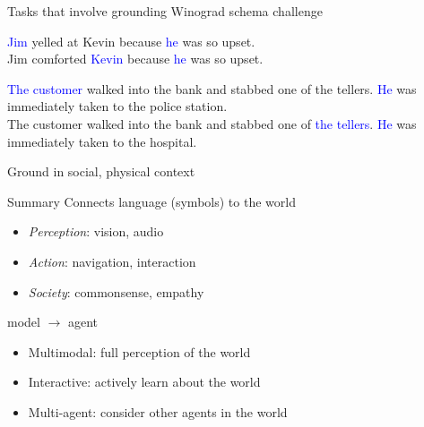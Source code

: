 \documentclass[usenames,dvipsnames,11pt,aspectratio=169]{beamer}
\begin{document}
\begin{frame}
    {Tasks that involve grounding}
    Winograd schema challenge 

    \textcolor{blue}{Jim} yelled at Kevin because \textcolor{blue}{he} was so upset.\\
    Jim comforted \textcolor{blue}{Kevin} because \textcolor{blue}{he} was so upset.

    \bigskip
    \textcolor{blue}{The customer} walked into the bank and stabbed one of the tellers. \textcolor{blue}{He} was immediately taken to the police station.\\
    The customer walked into the bank and stabbed one of \textcolor{blue}{the tellers}. \textcolor{blue}{He} was immediately taken to the hospital.

    \bigskip
    Ground in social, physical context
\end{frame}

\begin{frame}
    {Summary}
    Connects language (symbols) to the world\\
    \begin{itemize}
        \item \emph{Perception}: vision, audio
        \item \emph{Action}: navigation, interaction
        \item \emph{Society}: commonsense, empathy
    \end{itemize}

    model $\to$ agent\\
    \begin{itemize}
        \item Multimodal: full perception of the world
        \item Interactive: actively learn about the world 
        \item Multi-agent: consider other agents in the world 
    \end{itemize}
\end{frame}
\end{document}

